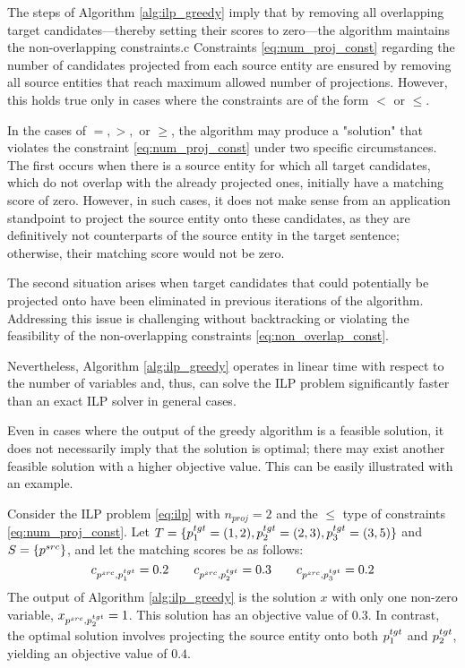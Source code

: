 The steps of Algorithm \ref{alg:ilp_greedy} imply that by removing all overlapping
target candidates—thereby setting their scores to zero—the algorithm maintains the non-overlapping constraints.c
Constraints \eqref{eq:num_proj_const} regarding the number of candidates projected from
each source entity are ensured by removing all source entities that reach maximum allowed number
of projections.  However, this holds true only in cases where the constraints are of
the form \( < \) or \( \leq \).

In the cases of \( =, >, \) or \( \geq \), the algorithm may produce a "solution" that
violates the constraint \eqref{eq:num_proj_const} under two specific circumstances.
The first occurs when there is a source entity for which all target candidates,
which do not overlap with the already projected ones, initially have a matching
score of zero. However, in such cases, it does not make sense from an application standpoint
to project the source entity onto these candidates, as they are definitively not
counterparts of the source entity in the target sentence; otherwise, their
matching score would not be zero.

The second situation arises when target candidates that could potentially be
projected onto have been eliminated in previous iterations of the algorithm.
Addressing this issue is challenging without backtracking or violating the
feasibility of the non-overlapping constraints \eqref{eq:non_overlap_const}.

Nevertheless, Algorithm \ref{alg:ilp_greedy} operates in linear time with respect to
the number of variables and, thus, can solve the ILP problem significantly faster than
an exact ILP solver in general cases.

Even in cases where the output of the greedy algorithm is a feasible solution, it does not necessarily imply that the solution is optimal; there may exist another feasible solution with a higher objective value. This can be easily illustrated with an example.

Consider the ILP problem \eqref{eq:ilp} with \( n_{proj} = 2 \) and the \( \leq \)
type of constraints \eqref{eq:num_proj_const}. Let \( T = \{ p_1^{tgt} = (1, 2), p_2^{tgt} = (2, 3), p_3^{tgt} = (3, 5) \} \)
and \( S = \{ p^{src} \} \), and let the matching scores be as follows:
\[
  c_{p^{src}, p_1^{tgt}} = 0.2 \qquad
  c_{p^{src}, p_2^{tgt}} = 0.3 \qquad
  c_{p^{src}, p_3^{tgt}} = 0.2
\]
The output of Algorithm \ref{alg:ilp_greedy} is the solution \( x \) with only one
non-zero variable, \( x_{p^{src}, p_2^{tgt}} = 1 \). This solution has an objective
value of \( 0.3 \). In contrast, the optimal solution involves projecting the source
entity onto both \( p_1^{tgt} \) and \( p_2^{tgt} \), yielding an objective value
of \( 0.4 \).
